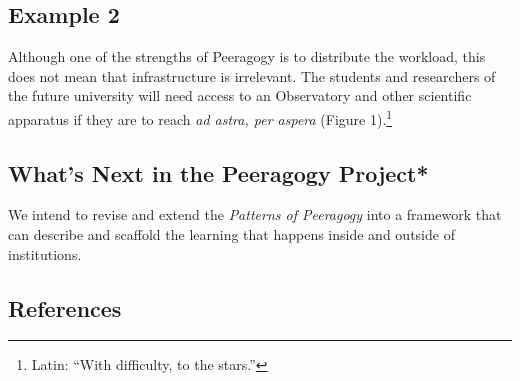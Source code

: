 \hypertarget{example-2}{%
\subsection{Example 2}\label{example-2}}

Although one of the strengths of {{Peeragogy}} is to distribute the
workload, this does not mean that infrastructure is irrelevant. The
students and researchers of the future university will need access to an
Observatory and other scientific apparatus if they are to reach \emph{ad
astra, per aspera} (Figure 1).\footnote{Latin: ``With difficulty, to the
  stars.''}

\hypertarget{whats-next-in-the-peeragogy-project}{%
\subsection{What's Next in the Peeragogy
Project*}\label{whats-next-in-the-peeragogy-project}}

We intend to revise and extend the \emph{Patterns of Peeragogy} into a
framework that can describe and scaffold the learning that happens
inside and outside of institutions.

\hypertarget{references}{%
\subsection{References}\label{references}}

